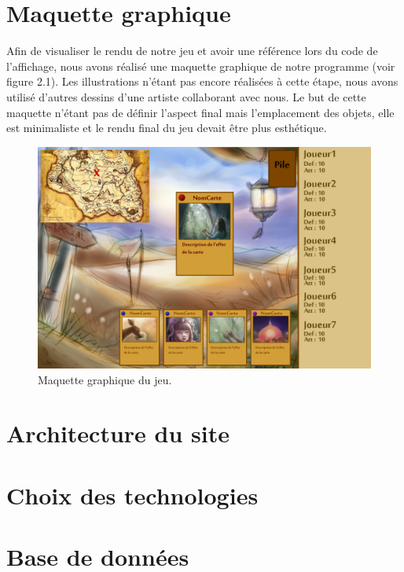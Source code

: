 \documentclass[12pt]{report}
\begin{document}
    \section{Maquette graphique}
    
    Afin de visualiser le rendu de notre jeu et avoir une référence lors du code de l'affichage, nous avons réalisé une maquette graphique de notre programme (voir figure 2.1). Les illustrations n'étant pas encore réalisées à cette étape, nous avons utilisé d'autres dessins d'une artiste collaborant avec nous. Le but de cette maquette n'étant pas de définir l'aspect final mais l'emplacement des objets, elle est minimaliste et le rendu final du jeu devait être plus esthétique.\\[1.5cm]
    
    \begin{figure}[h!]
    	\centering
	    \includegraphics[scale=2.8]{mock-up.png}
	    \caption{Maquette graphique du jeu.}
    \end{figure}

    
    \section{Architecture du site}
    
    \section{Choix des technologies}
    
    \section{Base de données}
    
\end{document}
